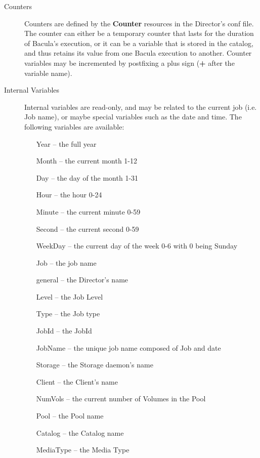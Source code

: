 \begin{description}

\item [Counters]
   Counters are defined by the {\bf Counter}  resources in the Director's conf
file. The counter can either  be a temporary counter that lasts for the
duration of Bacula's  execution, or it can be a variable that is stored in
the catalog, and thus retains its value from one Bacula execution  to another.
Counter variables may be incremented by postfixing  a plus sign ({\bf +} after
the variable name).

\item [Internal Variables]
   Internal variables are read-only,  and may be related to the current job (i.e.
Job name), or  maybe special variables such as the date and time.  The
following variables are available:

\begin{itemize}
\item [Year]  -- the full year
\item [Month]  -- the current month 1-12
\item [Day]  -- the day of the month 1-31
\item [Hour]  -- the hour 0-24
\item [Minute]  -- the current minute 0-59
\item [Second]  -- the current second 0-59
\item [WeekDay]  -- the current day of the week 0-6 with 0 being Sunday
\item [Job]  -- the job name
\item [general]  -- the Director's name
\item [Level]  -- the Job Level
\item [Type]  -- the Job type
\item [JobId]  -- the JobId
\item [JobName]  -- the unique job name composed of Job and date
\item [Storage]  -- the Storage daemon's name
\item [Client]  -- the Client's name
\item [NumVols]  -- the current number of Volumes in the Pool
\item [Pool]  -- the Pool name
\item [Catalog]  -- the Catalog name
\item [MediaType] -- the Media Type
   \end{itemize}


\end{description}
